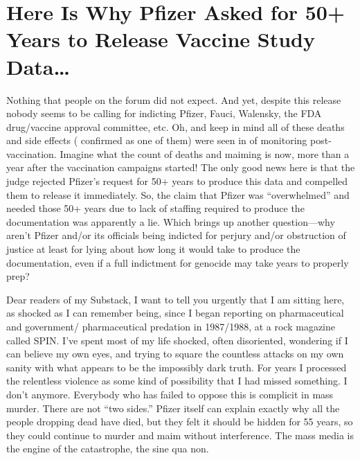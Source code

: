 \chapter{Here Is Why Pfizer Asked for 50+ Years to Release Vaccine Study Data\dots{}}

\begin{refsection}

Nothing that people on the forum did not expect. And yet, despite this release nobody seems to be calling for indicting Pfizer, Fauci, Walensky, the FDA drug/vaccine approval committee, etc. Oh, and keep in mind all of these deaths and side effects ( confirmed as one of them) were seen in  of monitoring post-vaccination. Imagine what the count of deaths and maiming is now, more than a year after the vaccination campaigns started! The only good news here is that the judge rejected Pfizer's request for 50+ years to produce this data and compelled them to release it immediately. So, the claim that Pfizer was \enquote{overwhelmed} and needed those 50+ years due to lack of staffing required to produce the documentation was apparently a lie. Which brings up another question---why aren't Pfizer and/or its officials being indicted for perjury and/or obstruction of justice at least for lying about how long it would take to produce the documentation, even if a full indictment for genocide may take years to properly prep?

\begin{tcolorbox}[quote]

Dear readers of my Substack, I want to tell you urgently that I am sitting here, as shocked as I can remember being, since I began reporting on pharmaceutical and government/ pharmaceutical predation in 1987/1988, at a rock magazine called SPIN. I've spent most of my life shocked, often disoriented, wondering if I can believe my own eyes, and trying to square the countless attacks on my own sanity with what appears to be the impossibly dark truth. For years I processed the relentless violence as some kind of possibility that I had missed something. I don't anymore. Everybody who has failed to oppose this is complicit in mass murder. There are not \enquote{two sides.} Pfizer itself can explain exactly why all the people dropping dead have died, but they felt it should be hidden for 55 years, so they could continue to murder and maim without interference. The mass media is the engine of the catastrophe, the sine qua non.


\end{tcolorbox}
\end{refsection}
